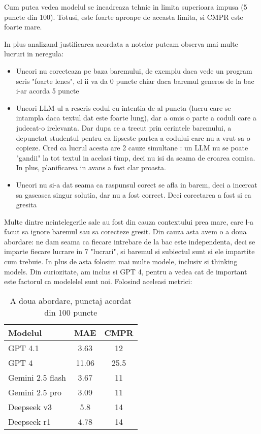 \documentclass[12pt, a4paper]{report}
\begin{document}
Cum putea vedea modelul se incadreaza tehnic in limita superioara impusa (5 puncte din 100). Totusi, este foarte aproape de aceasta limita, si CMPR este foarte mare.

In plus analizand justificarea acordata a notelor puteam observa mai multe lucruri in neregula:
\begin{itemize}
  \item Uneori nu corecteaza pe baza baremului, de exemplu daca vede un program scris "foarte lenes", el ii va da 0 puncte chiar daca baremul generos de la bac i-ar acorda 5 puncte 
  \item Uneori LLM-ul a rescris codul cu intentia de al puncta (lucru care se intampla daca textul dat este foarte lung), dar a omis o parte a coduli care 
  a judecat-o irelevanta. Dar dupa ce a trecut prin cerintele baremului, a depunctat studentul pentru ca lipseste partea a codului care nu a vrut sa o copieze.
  Cred ca lucrul acesta are 2 cauze simultane : un LLM nu se poate "gandii" la tot textul in acelasi timp, deci nu isi da seama de eroarea comisa. In plus, planificarea in avans a fost clar proasta.
  \item Uneori nu si-a dat seama ca raspunsul corect se afla in barem, deci a incercat sa gaseasca singur solutia, dar nu a fost correct. Deci corectarea a fost si ea gresita
\end{itemize}

Multe dintre neintelegerile sale au fost din cauza contextului prea mare, care l-a facut sa ignore baremul sau sa corecteze gresit. 
Din cauza asta avem o a doua abordare: ne dam seama ca fiecare intrebare de la bac este independenta, deci se imparte fiecare lucrare in 7 "lucrari", si baremul si subiectul
sunt si ele impartite cum trebuie. In plus de asta folosim mai multe modele, inclusiv si thinking models. Din curiozitate, am inclus si GPT 4, pentru a vedea cat de important este factorul ca modelelel sunt noi.
Folosind aceleasi metrici:

\begin{table}[h!]
\centering
\begin{tabular}{|l|c|c|}
\hline
\textbf{Modelul} & \textbf{MAE} & \textbf{CMPR} \\
\hline
GPT 4.1 & 3.63 & 12\\

\hline
GPT 4 & 11.06 & 25.5 \\
\hline
Gemini 2.5 flash & 3.67 & 11\\


\hline
Gemini 2.5 pro & 3.09 & 11\\
\hline
Deepseek v3  & 5.8 & 14 \\

\hline
Deepseek r1 & 4.78 & 14 
\\
\hline

\end{tabular}
\caption{A doua abordare, punctaj acordat din 100 puncte}

\end{table}
\end{document}
